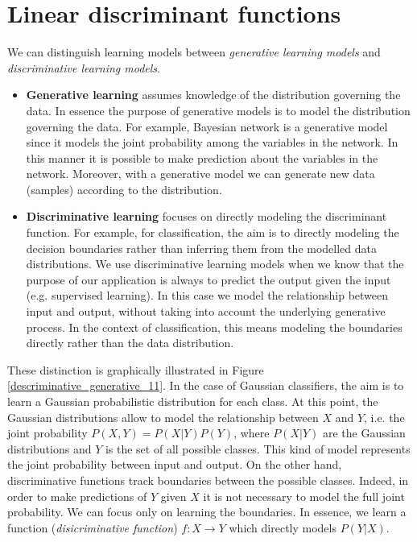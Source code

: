 \chapter{Linear discriminant functions}
\label{cha:linear_discriminant_function} We can distinguish learning models between
\textit{generative learning models} and \textit{discriminative learning models}.
\begin{itemize}
	\item \textbf{Generative learning} assumes knowledge of the distribution
		governing the data. In essence the purpose of generative models is to model the
		distribution governing the data. For example, Bayesian network is a generative
		model since it models the joint probability among the variables in the network.
		In this manner it is possible to make prediction about the variables in the
		network. Moreover, with a generative model we can generate new data (samples)
		according to the distribution.

	\item \textbf{Discriminative learning} focuses on directly modeling the
		discriminant function. For example, for classification, the aim is to directly
		modeling the decision boundaries rather than inferring them from the modelled
		data distributions. We use discriminative learning models when we know that
		the purpose of our application is always to predict the output given the
		input (e.g. supervised learning). In this case we model the relationship
		between input and output, without taking into account the underlying generative
		process. In the context of classification, this means modeling the boundaries
		directly rather than the data distribution.
\end{itemize}
These distinction is graphically illustrated in Figure
\ref{descriminative_generative_11}. In the case of Gaussian classifiers, the aim
is to learn a Gaussian probabilistic distribution for each class. At this point,
the Gaussian distributions allow to model the relationship between $X$ and $Y$, i.e.
the joint probability $P(X,Y) = P(X|Y)P(Y)$, where $P(X|Y)$ are the Gaussian distributions
and $Y$ is the set of all possible classes. This kind of model represents the
joint probability between input and output. On the other hand, discriminative
functions track boundaries between the possible classes. Indeed, in order to
make predictions of $Y$ given $X$ it is not necessary to model the full joint
probability. We can focus only on learning the boundaries. In essence, we learn a
function (\textit{disicriminative function}) $f: X \rightarrow Y$ which directly
models $P(Y|X)$.

